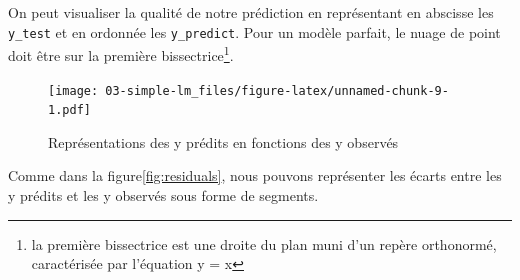 \documentclass[
]{book}
\newenvironment{Shaded}{\begin{snugshade}}{\end{snugshade}}
\newcommand{\AttributeTok}[1]{\textcolor[rgb]{0.77,0.63,0.00}{#1}}
\newcommand{\CommentTok}[1]{\textcolor[rgb]{0.56,0.35,0.01}{\textit{#1}}}
\newcommand{\DecValTok}[1]{\textcolor[rgb]{0.00,0.00,0.81}{#1}}
\newcommand{\FunctionTok}[1]{\textcolor[rgb]{0.00,0.00,0.00}{#1}}
\newcommand{\NormalTok}[1]{#1}
\newcommand{\OtherTok}[1]{\textcolor[rgb]{0.56,0.35,0.01}{#1}}
\newcommand{\SpecialCharTok}[1]{\textcolor[rgb]{0.00,0.00,0.00}{#1}}
\newcommand{\StringTok}[1]{\textcolor[rgb]{0.31,0.60,0.02}{#1}}
\begin{document}
On peut visualiser la qualité de notre prédiction en représentant en
abscisse les \texttt{y\_test} et en ordonnée les \texttt{y\_predict}. Pour un modèle
parfait, le nuage de point doit être sur la première
bissectrice\footnote{la première bissectrice est une droite du plan muni d'un
  repère orthonormé, caractérisée par l'équation y = x}.

\begin{Shaded}
\end{Shaded}

\begin{figure}
\centering
\texttt{[image: 03-simple-lm\_files/figure-latex/unnamed-chunk-9-1.pdf]}
\caption{\label{fig:unnamed-chunk-9}Représentations des y prédits en fonctions des y observés}
\end{figure}

Comme dans la figure\ref{fig:residuals}, nous pouvons représenter les
écarts entre les y prédits et les y observés sous forme de segments.

\begin{Shaded}
\end{Shaded}
\end{document}
